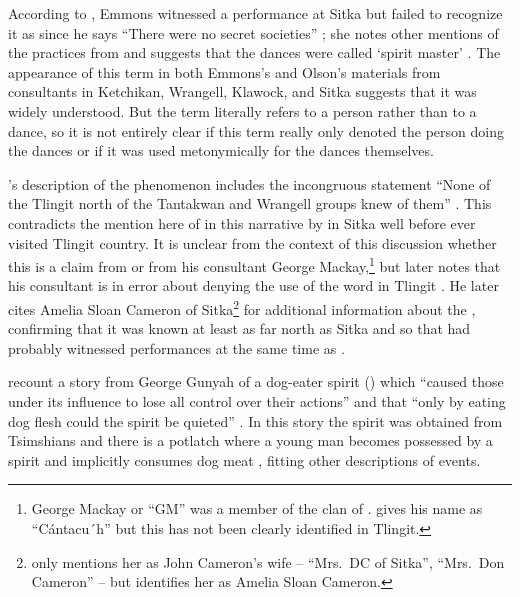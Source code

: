 According to \citeauthor{de-laguna:1972}, Emmons witnessed a performance at Sitka but failed to recognize it as  since he says “There were no secret societies” \parencite[21]{emmons:1991}; she notes other mentions of the practices from \textcite[98–100, 118–121]{olson:1967} and suggests that the dances were called  ‘spirit master’ \parencite[319]{emmons:1991}.
The appearance of this term in both Emmons’s and Olson’s materials from consultants in Ketchikan, Wrangell, Klawock, and Sitka suggests that it was widely understood.
But the term  literally refers to a person rather than to a dance, so it is not entirely clear if this term really only denoted the person doing the dances or if it was used metonymically for the dances themselves.

\citeauthor{olson:1967}’s description of the  phenomenon includes the incongruous statement “None of the Tlingit north of the Tantakwan and Wrangell groups knew of them” \parencite[98]{olson:1967}.
This contradicts the mention here of  in this narrative by  in Sitka well before \citeauthor{olson:1967} ever visited Tlingit country.
It is unclear from the context of this discussion whether this is a claim from \citeauthor{olson:1967} or from his consultant George Mackay,\footnote{George Mackay or “GM” was a member of the  clan of  \parencite[82–83]{olson:1967}.
\citeauthor{olson:1967} gives his name as “Cántacu´h” \parencite[98]{olson:1967} but this has not been clearly identified in Tlingit.} but later \citeauthor{olson:1967} notes that his consultant is in error about denying the use of the word  in Tlingit \parencite[100]{olson:1967}.
He later cites  Amelia Sloan Cameron of Sitka\footnote{\citeauthor{olson:1967} only mentions her as  John Cameron’s wife – “Mrs.\ DC of Sitka”, “Mrs.\ Don Cameron” – but \textcite[130]{jones:2017} identifies her as  Amelia Sloan Cameron.} for additional information about the , confirming that it was known at least as far north as Sitka and so that  had probably witnessed  performances at the same time as .

\citeauthor{garfield-forrest:1948} recount a story from  George Gunyah of a dog-eater spirit () which “caused those under its influence to lose all control over their actions” and that “only by eating dog flesh could the spirit be quieted” \parencite[143]{garfield-forrest:1948}.
In this story the spirit was obtained from Tsimshians and there is a potlatch where a young man becomes possessed by a spirit and implicitly consumes dog meat \parencite[141–145]{garfield-forrest:1948}, fitting other descriptions of  events.

